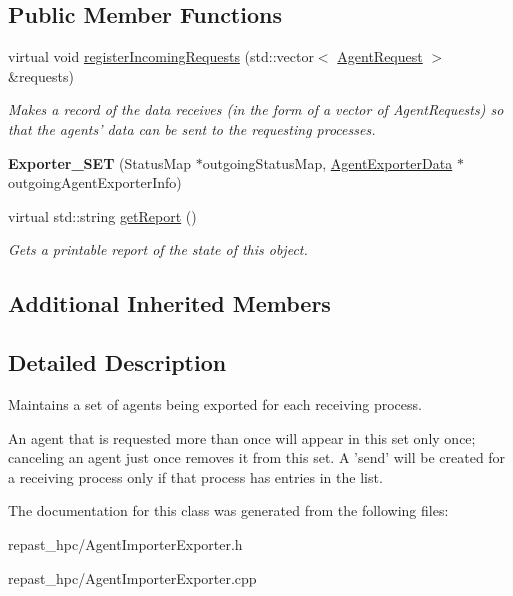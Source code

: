 \subsection*{Public Member Functions}
\begin{DoxyCompactItemize}
\item 
\hypertarget{classrepast_1_1_exporter___s_e_t_a06463c5911250be6ac77c1c3b5f2ef34}{virtual void \hyperlink{classrepast_1_1_exporter___s_e_t_a06463c5911250be6ac77c1c3b5f2ef34}{register\-Incoming\-Requests} (std\-::vector$<$ \hyperlink{classrepast_1_1_agent_request}{Agent\-Request} $>$ \&requests)}\label{classrepast_1_1_exporter___s_e_t_a06463c5911250be6ac77c1c3b5f2ef34}

\begin{DoxyCompactList}\small\item\em Makes a record of the data receives (in the form of a vector of Agent\-Requests) so that the agents' data can be sent to the requesting processes. \end{DoxyCompactList}\item 
\hypertarget{classrepast_1_1_exporter___s_e_t_afb4b63299bb8a761dfc55dd9e4fec3d8}{{\bfseries Exporter\-\_\-\-S\-E\-T} (Status\-Map $\ast$outgoing\-Status\-Map, \hyperlink{classrepast_1_1_agent_exporter_data}{Agent\-Exporter\-Data} $\ast$outgoing\-Agent\-Exporter\-Info)}\label{classrepast_1_1_exporter___s_e_t_afb4b63299bb8a761dfc55dd9e4fec3d8}

\item 
\hypertarget{classrepast_1_1_exporter___s_e_t_a84d24e786b0048d12b789bfdf14d276f}{virtual std\-::string \hyperlink{classrepast_1_1_exporter___s_e_t_a84d24e786b0048d12b789bfdf14d276f}{get\-Report} ()}\label{classrepast_1_1_exporter___s_e_t_a84d24e786b0048d12b789bfdf14d276f}

\begin{DoxyCompactList}\small\item\em Gets a printable report of the state of this object. \end{DoxyCompactList}\end{DoxyCompactItemize}
\subsection*{Additional Inherited Members}


\subsection{Detailed Description}
Maintains a set of agents being exported for each receiving process. 

An agent that is requested more than once will appear in this set only once; canceling an agent just once removes it from this set. A 'send' will be created for a receiving process only if that process has entries in the list. 

The documentation for this class was generated from the following files\-:\begin{DoxyCompactItemize}
\item 
repast\-\_\-hpc/Agent\-Importer\-Exporter.\-h\item 
repast\-\_\-hpc/Agent\-Importer\-Exporter.\-cpp\end{DoxyCompactItemize}
